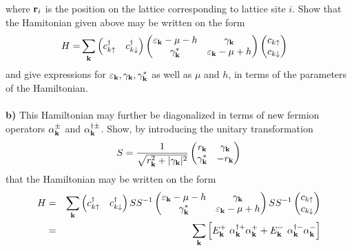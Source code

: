 \documentclass{article}
\begin{document}
where ${\bf r}_i$ is the position on the lattice corresponding to lattice site $i$. Show that the Hamitonian given above may be written on the form
\begin{align}
\begin{split}
H =&   \sum_{{\bf k}} 
\begin{pmatrix} c_{k\uparrow}^\dagger & c_{k \downarrow}^\dagger  \end{pmatrix}
\begin{pmatrix} \varepsilon_{{\bf k}}-\mu - h & \gamma_{{\bf k}} \\ \gamma_{{\bf k}}^{*} & \varepsilon_{{\bf k}} - \mu + h \end{pmatrix}  
\begin{pmatrix} c_{k \uparrow} \\ c_{ k\downarrow}  \end{pmatrix}
\end{split} \nonumber 
\end{align}
and give expressions for $\varepsilon_{{\bf k}}, \gamma_{{\bf k}}, \gamma_{{\bf k}}^{*}$ as well as $\mu$ and $h$, in terms of the parameters of the Hamiltonian.  
\ \\
\ \\
{\bf b)} This Hamiltonian may further be diagonalized in terms of new fermion operators $\alpha^{\pm}_{{\bf k}}$ and $\alpha^{\dagger \pm}_{{\bf k}}$. Show, by introducing the unitary transformation
\begin{eqnarray}
S = \frac{1}{\sqrt{r_{{\bf k}}^2  + | \gamma_{{\bf k}} |^2}}\begin{pmatrix} r_{{\bf k}} & \gamma_{{\bf k}} \\ \gamma_{{\bf k}}^{*} & -r_{{\bf k}} \end{pmatrix}  \nonumber 
\end{eqnarray}
 that the Hamiltonian may be written on the form
 \begin{eqnarray}
H & =&   \sum_{{\bf k}} 
\begin{pmatrix} c_{k\uparrow}^\dagger & c_{k \downarrow}^\dagger  \end{pmatrix} S S^{-1}
\begin{pmatrix} \varepsilon_{{\bf k}}-\mu - h & \gamma_{{\bf k}} \\ \gamma_{{\bf k}}^{*} & \varepsilon_{{\bf k}} - \mu + h \end{pmatrix}   S S^{-1}
\begin{pmatrix} c_{k \uparrow} \\ c_{ k\downarrow}  \end{pmatrix} \nonumber \\
& = &  \sum_{{\bf k}}  \left[  E^{+}_{{\bf k}} ~ \alpha^{\dagger +}_{{\bf k}} \alpha^{+}_{{\bf k}} 
 + E^{-}_{{\bf k}} ~ \alpha^{\dagger -}_{{\bf k}} \alpha^{-}_{{\bf k}} \right]  \nonumber
 \end{eqnarray}
\end{document}
